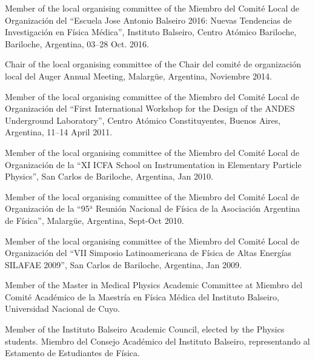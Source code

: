 \ifeng
Member of the local organising committee of the 
\else
Miembro del Comité Local de Organización del 
\fi
``Escuela Jose Antonio Balseiro 2016: Nuevas Tendencias de Investigación en Física Médica'', Instituto Balseiro, Centro Atómico Bariloche, Bariloche, Argentina, 03--28 Oct.
2016.

\ifeng
Chair of the local organising committee of the
\else
Chair del comité de organización local del
\fi
Auger Annual Meeting, Malargüe, Argentina, Noviembre 2014.

\ifeng
Member of the local organising committee of the 
\else
Miembro del Comité Local de Organización del 
\fi
``First International Workshop for the Design of the ANDES Underground Laboratory'', Centro Atómico Constituyentes, Buenos Aires, Argentina, 11--14 April 2011.

\ifeng
Member of the local organising committee of the 
\else
Miembro del Comité Local de Organización de la 
\fi
``XI ICFA School on Instrumentation in Elementary Particle Physics'', San Carlos de Bariloche, Argentina, Jan 2010.

\ifeng
Member of the local organising committee of the 
\else
Miembro del Comité Local de Organización de la 
\fi
``95$^{\mathrm{a}}$ Reunión Nacional de Física de la Asociación Argentina de Física'', Malargüe, Argentina, Sept-Oct 2010.

\ifeng
Member of the local organising committee of the 
\else
Miembro del Comité Local de Organización del
\fi
``VII Simposio Latinoamericana de Física de Altas Energías SILAFAE 2009'', San Carlos de Bariloche, Argentina, Jan 2009.

\ifeng
Member of the Master in Medical Physics Academic Committee at
\else
Miembro del Comité Académico de la Maestría en Física Médica del
\fi
 Instituto Balseiro, Universidad Nacional de Cuyo.

\ifeng
Member of the Instituto Balseiro Academic Council, elected by the Physics students.
\else
Miembro del Consejo Académico del Instituto Balseiro, representando al Estamento de Estudiantes de Física.
\fi
